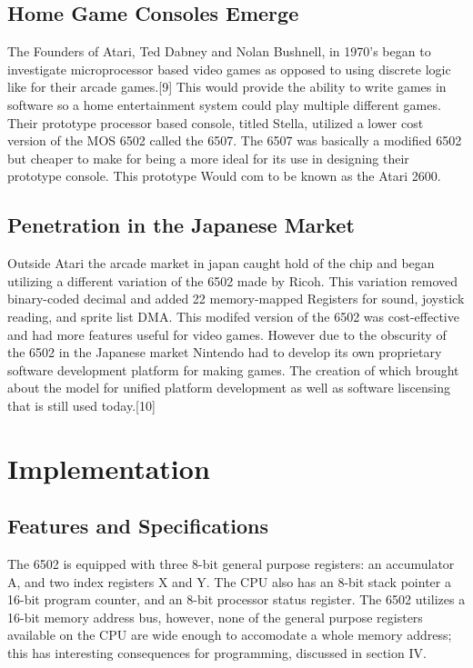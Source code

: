 \documentclass[journal]{IEEEtran}
\begin{document}
\subsection{Home Game Consoles Emerge}
The Founders of Atari, Ted Dabney and Nolan Bushnell, in 1970's began to investigate microprocessor based 
video games as opposed to using discrete logic like for their arcade games.[9]  This would provide the ability 
to write games in software so a home entertainment system could play multiple different games.  Their 
prototype processor based console, titled Stella, utilized a lower cost version of the MOS 6502 called the 
6507.  The 6507 was basically a modified 6502 but cheaper to make for being a more ideal for its use in designing 
their prototype console.  This prototype Would com to be known as the Atari 2600.  


\subsection{Penetration in the Japanese Market}
Outside Atari the arcade market in japan caught hold of the chip and began utilizing a different variation of 
the 6502 made by Ricoh.  This variation removed binary-coded decimal and added 22 memory-mapped Registers for
sound, joystick reading, and sprite list DMA.  This modifed version of the 6502 was cost-effective and had more
features useful for video games.  However due to the obscurity of the 6502 in the Japanese market Nintendo had
to develop its own proprietary software development platform for making games.  The creation of which brought 
about the model for unified platform development as well as software liscensing that is still used today.[10]

\section{Implementation}

\subsection{Features and Specifications}

The 6502 is equipped with three 8-bit general purpose registers: an accumulator
A, and two index registers X and Y. The CPU also has
an 8-bit stack pointer a 16-bit program counter, and an 8-bit processor status
register. The 6502 utilizes a 16-bit memory address bus, however, none of the
general purpose registers available on the CPU are wide enough to accomodate a
whole memory address; this has interesting consequences for programming,
discussed in section IV.
\end{document}
